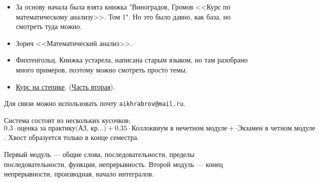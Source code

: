 \begin{itemize}
    \item За основу начала была взята книжка "Виноградов, Громов <<Курс по математическому анализу>>. Том 1". Но это было давно, как база, но смотреть туда можно.
    \item Зорич <<Математический анализ>>.
    \item Фихтенгольц. Книжка устарела, написана старым языком, но там разобрано много примеров, поэтому можно смотреть просто темы.
    \item \href{https://stepik.org/course/716/promo}{Курс на степике}. (\href{https://stepik.org/course/711/promo}{Часть вторая}).
\end{itemize}
Для связи можно использовать почту \texttt{aikhrabrov@mail.ru}.

Система состоит из нескольких кусочков: $0.3 \cdot \text{оценка за практику(АЗ, кр\ldots)} + 0.35 \cdot \text{Коллоквиум в нечетном модуле} + \cdot \text{Экзамен в четном модуле}$. Хвост образуется только в конце семестра.

Первый модуль --- общие слова, последовательности, пределы последовательности, функции, непрерывность. Второй модуль --- конец непрерывности, производная, начало интегралов.



